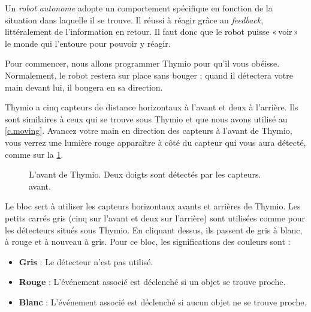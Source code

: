 \label{ch.pet}

Un \emph{robot autonome} adopte un comportement spécifique en fonction de la situation dans laquelle il se trouve.
Il réussi à réagir grâce au \textit{feedback}, littéralement de l'information en retour.
Il faut donc que le robot puisse «\,voir\,» le monde qui l'entoure pour pouvoir y réagir.


Pour commencer, nous allons programmer Thymio pour qu'il vous obéisse.
Normalement, le robot restera sur place sans bouger ; quand il détectera votre main devant lui, il bougera en sa direction.

Thymio a cinq capteurs de distance horizontaux à l'avant et deux à l'arrière.
Ils sont similaires à ceux qui se trouve sous Thymio et que nous avons utilisé au \cref{c.moving}.
Avancez votre main en direction des capteurs à l'avant de Thymio, vous verrez une lumière rouge apparaître à côté du capteur qui vous aura détecté, comme sur la \cref{fig.detect}.

\begin{figure}
\begin{center}
\caption{L'avant de Thymio. Deux doigts sont détectés par les capteurs. avant.}\label{fig.detect}
\end{center}
\end{figure}

Le bloc  sert à utiliser les capteurs horizontaux avants et arrières de Thymio.
Les petits carrés gris (cinq sur l'avant et deux sur l'arrière) sont utilisées comme pour les détecteurs situés sous Thymio.
En cliquant dessus, ils passent de gris à blanc, à rouge et à nouveau à gris.
Pour ce bloc, les significations des couleurs sont :

\begin{itemize}
\item \textbf{Gris} : Le détecteur n'est pas utilisé.
\item \textbf{Rouge} : L'événement associé est déclenché si un objet se trouve proche.
\item \textbf{Blanc} : L'événement associé est déclenché si aucun objet ne se trouve proche.
\end{itemize}

